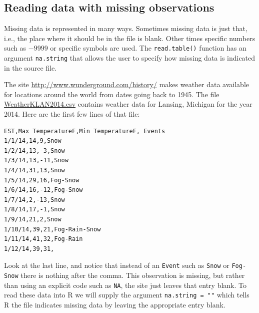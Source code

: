 \documentclass[12pt,oneside]{book}\usepackage[]{graphicx}\usepackage[]{color}
\begin{document}
\subsection{Reading data with missing observations}
Missing data is represented in many ways. Sometimes missing data is just that, i.e., the place where it should be in the file is blank. Other times specific numbers such as $-9999$ or specific symbols are used. The \verb+read.table()+ function has an argument \verb+na.string+ that allows the user to specify how missing data is indicated in the source file.

The site \url{http://www.wunderground.com/history/} makes weather data available for locations around the world from dates going back to 1945. The file \url{WeatherKLAN2014.csv} contains weather data for Lansing, Michigan for the year 2014. Here are the first few lines of that file:
\begin{verbatim}
EST,Max TemperatureF,Min TemperatureF, Events
1/1/14,14,9,Snow
1/2/14,13,-3,Snow
1/3/14,13,-11,Snow
1/4/14,31,13,Snow
1/5/14,29,16,Fog-Snow
1/6/14,16,-12,Fog-Snow
1/7/14,2,-13,Snow
1/8/14,17,-1,Snow
1/9/14,21,2,Snow
1/10/14,39,21,Fog-Rain-Snow
1/11/14,41,32,Fog-Rain
1/12/14,39,31,
\end{verbatim}
Look at the last line, and notice that instead of an \verb+Event+ such as \verb+Snow+ or \verb+Fog-Snow+ there is nothing after the comma. This observation is missing, but rather than using an explicit code such as \verb+NA+, the site just leaves that entry blank. To read these data into R we will supply the argument \verb+na.string = ""+ which tells R the file indicates missing data by leaving the appropriate entry blank.
\end{document}
